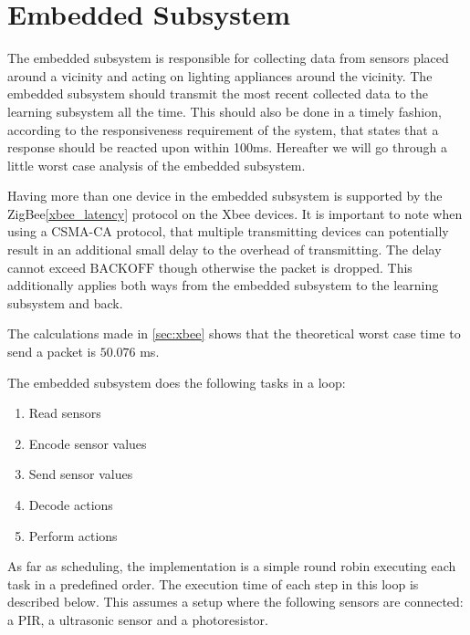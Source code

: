 \section{Embedded Subsystem}\label{sub:sensorStation}

The embedded subsystem is responsible for collecting data from sensors placed around a vicinity and acting on lighting appliances around the vicinity. The embedded subsystem should transmit the most recent collected data to the learning subsystem all the time. This should also be done in a timely fashion, according to the responsiveness requirement of the system, that states that a response should be reacted upon within 100ms. Hereafter we will go through a little worst case analysis of the embedded subsystem.

Having more than one device in the embedded subsystem is supported by the ZigBee\cref{xbee_latency} protocol on the Xbee devices. It is important to note when using a CSMA-CA protocol, that multiple transmitting devices can potentially result in an additional small delay to the overhead of transmitting. The delay cannot exceed $\text{BACKOFF}$ though otherwise the packet is dropped. This additionally applies both ways from the embedded subsystem to the learning subsystem and back.

The calculations made in \cref{sec:xbee} shows that the theoretical worst case time to send a packet is $50.076$ ms.

The embedded subsystem does the following tasks in a loop:
\begin{enumerate}
  \item Read sensors
  \item Encode sensor values
  \item Send sensor values
  \item Decode actions
  \item Perform actions
\end{enumerate}

As far as scheduling, the implementation is a simple round robin executing each task in a predefined order. The execution time of each step in this loop is described below. This assumes a setup where the following sensors are connected: a PIR, a ultrasonic sensor and a photoresistor.

